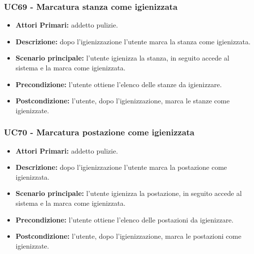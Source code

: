 \subsubsection{UC69 - Marcatura stanza come igienizzata}
\begin{itemize}
           	\item\textbf{Attori Primari:} addetto pulizie.
           	\item\textbf{Descrizione:} dopo l'igienizzazione l'utente marca la stanza come igienizzata.
           	\item\textbf{Scenario principale:} l'utente igienizza la stanza, in seguito accede al sistema e la marca come igienizzata.
           	\item\textbf{Precondizione:} l'utente ottiene l'elenco delle stanze da igienizzare.
           	\item\textbf{Postcondizione:} l'utente, dopo l'igienizzazione, marca le stanze come igienizzate.
\end{itemize}

\subsubsection{UC70 - Marcatura postazione come igienizzata}
\begin{itemize}
           	\item\textbf{Attori Primari:} addetto pulizie.
           	\item\textbf{Descrizione:} dopo l'igienizzazione l'utente marca la postazione come igienizzata.
           	\item\textbf{Scenario principale:} l'utente igienizza la postazione, in seguito accede al sistema e la marca come igienizzata.
           	\item\textbf{Precondizione:} l'utente ottiene l'elenco delle postazioni da igienizzare.
           	\item\textbf{Postcondizione:} l'utente, dopo l'igienizzazione, marca le postazioni come igienizzate.
\end{itemize}

